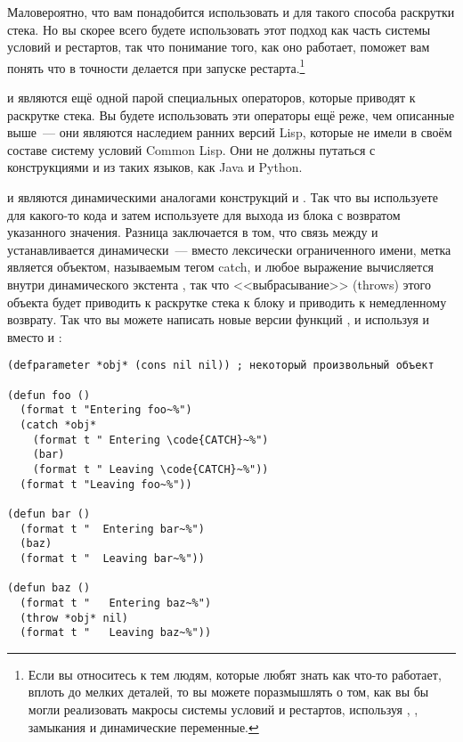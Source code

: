 Маловероятно, что вам понадобится использовать  и  для такого
способа раскрутки стека.  Но вы скорее всего будете использовать этот подход как часть
системы условий и рестартов, так что понимание того, как оно работает, поможет вам понять
что в точности делается при запуске рестарта.\footnote{Если вы относитесь к тем людям,
  которые любят знать как что-то работает, вплоть до мелких деталей, то вы можете
  поразмышлять о том, как вы бы могли реализовать макросы системы условий и рестартов,
  используя , , замыкания и динамические переменные.}

 и  являются ещё одной парой специальных операторов, которые
приводят к раскрутке стека.  Вы будете использовать эти операторы ещё реже, чем описанные
выше~--- они являются наследием ранних версий Lisp, которые не имели в своём составе
систему условий Common Lisp.  Они не должны путаться с конструкциями  и
 из таких языков, как Java и Python.

 и  являются динамическими аналогами конструкций  и
.  Так что вы используете  для какого-то кода и затем
используете  для выхода из блока  с возвратом указанного значения.
Разница заключается в том, что связь между  и  устанавливается
динамически~--- вместо лексически ограниченного имени, метка  является
объектом, называемым тегом catch, и любое выражение  вычисляется внутри
динамического экстента , так что <<выбрасывание>> (throws) этого объекта будет
приводить к раскрутке стека к блоку  и приводить к немедленному возврату.  Так
что вы можете написать новые версии функций ,  и  используя
 и  вместо  и :

\begin{lstlisting}
(defparameter *obj* (cons nil nil)) ; некоторый произвольный объект

(defun foo ()
  (format t "Entering foo~%")
  (catch *obj*
    (format t " Entering \code{CATCH}~%")
    (bar)
    (format t " Leaving \code{CATCH}~%"))
  (format t "Leaving foo~%"))

(defun bar ()
  (format t "  Entering bar~%")
  (baz)
  (format t "  Leaving bar~%"))

(defun baz ()
  (format t "   Entering baz~%")
  (throw *obj* nil)
  (format t "   Leaving baz~%"))
\end{lstlisting}

